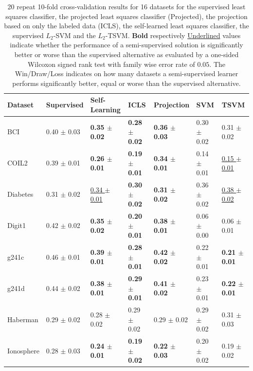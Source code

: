 \documentclass[smallcondensed]{svjour3}\usepackage[]{graphicx}\usepackage[]{color}
\begin{document}
\begin{table}[t]
\center
\caption{20 repeat 10-fold cross-validation results for 16 datasets for the supervised least squares classifier, the projected least squares classifier (Projected), the projection based on only the labeled data (ICLS), the self-learned least squares classifier, the supervised $L_2$-SVM and the $L_2$-TSVM. \textbf{Bold} respectively \underline{Underlined} values indicate whether the performance of a semi-supervised solution is significantly better or worse than the supervised alternative as evaluated by a one-sided Wilcoxon signed rank test with family wise error rate of $0.05$. The Win/Draw/Loss indicates on how many datasets a semi-supervised learner performs significantly better, equal or worse than the supervised alternative.} \label{table:crossvalidation-projection}
\begin{tabular}{lllll|ll}
  \toprule
Dataset & Supervised & Self-Learning & ICLS & Projection & SVM & TSVM \\ 
  \midrule
BCI & 0.40 $\pm$ 0.03 & \textbf{0.35 $\pm$ 0.02} & \textbf{0.28 $\pm$ 0.02} & \textbf{0.36 $\pm$ 0.03} & 0.30 $\pm$ 0.02 & 0.31 $\pm$ 0.02 \\ 
  COIL2 & 0.39 $\pm$ 0.01 & \textbf{0.26 $\pm$ 0.01} & \textbf{0.19 $\pm$ 0.01} & \textbf{0.34 $\pm$ 0.01} & 0.14 $\pm$ 0.01 & \underline{0.15 $\pm$ 0.01} \\ 
  Diabetes & 0.31 $\pm$ 0.02 & \underline{0.34 $\pm$ 0.01} & \textbf{0.30 $\pm$ 0.02} & \textbf{0.31 $\pm$ 0.02} & 0.36 $\pm$ 0.02 & \underline{0.38 $\pm$ 0.02} \\ 
  Digit1 & 0.42 $\pm$ 0.02 & \textbf{0.35 $\pm$ 0.02} & \textbf{0.20 $\pm$ 0.01} & \textbf{0.38 $\pm$ 0.01} & 0.06 $\pm$ 0.00 & 0.06 $\pm$ 0.01 \\ 
  g241c & 0.46 $\pm$ 0.01 & \textbf{0.39 $\pm$ 0.01} & \textbf{0.28 $\pm$ 0.01} & \textbf{0.42 $\pm$ 0.02} & 0.22 $\pm$ 0.01 & \textbf{0.21 $\pm$ 0.01} \\ 
  g241d & 0.44 $\pm$ 0.02 & \textbf{0.38 $\pm$ 0.01} & \textbf{0.29 $\pm$ 0.01} & \textbf{0.41 $\pm$ 0.02} & 0.23 $\pm$ 0.01 & \textbf{0.22 $\pm$ 0.01} \\ 
  Haberman & 0.29 $\pm$ 0.02 & 0.28 $\pm$ 0.02 & 0.29 $\pm$ 0.02 & 0.29 $\pm$ 0.02 & 0.29 $\pm$ 0.02 & 0.31 $\pm$ 0.03 \\ 
  Ionosphere & 0.28 $\pm$ 0.03 & \textbf{0.24 $\pm$ 0.01} & \textbf{0.19 $\pm$ 0.02} & \textbf{0.22 $\pm$ 0.03} & 0.20 $\pm$ 0.02 & 0.19 $\pm$ 0.02 \\ 

\end{tabular}
\end{table}
\end{document}
